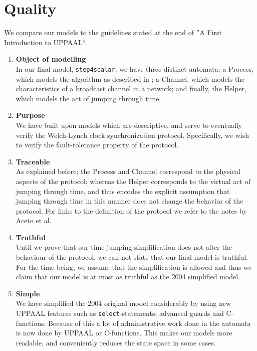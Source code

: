 \documentclass[a4paper,10pt]{article}
\newcommand{\UPPAAL}{UPPAAL\xspace}
\newcommand{\oldorig}{2004 original model\xspace}
\newcommand{\oldsimple}{2004 simplified model\xspace}
\newcommand{\newfinal}{our final model\xspace}
\begin{document}
\section{Quality\label{sec:quality}}


We compare our models to the guidelines stated at the end of ''A First Introduction to UPPAAL``. \cite{Vaandrager2011First}

\begin{enumerate}
\item \textbf{Object of modelling} \\
	In \newfinal, \texttt{step4scalar}, we have three distinct automata: a Process, which models the algorithm as described in \cite{Welch1984Anew}; a Channel, which models the characteristics of a broadcast channel in a network; and finally, the Helper, which models the act of jumping through time.
\item \textbf{Purpose} \\
	We have built upon models which are descriptive, and serve to eventually verify the Welch-Lynch clock synchronization protocol. Specifically, we wish to verify the fault-tolerance property of the protocol.
\item \textbf{Traceable} \\
	As explained before; the Process and Channel correspond to the physical aspects of the protocol; whereas the Helper corresponds to the virtual act of jumping through time, and thus encodes the explicit assumption that jumping through time in this manner does not change the behavior of the protocol. For links to the definition of the protocol we refer to the notes by Aceto et al. \cite{Aceto2004Notes}
\item \textbf{Truthful} \\
	Until we prove that our time jumping simplification does not alter the behaviour of the protocol, we can not state that \newfinal is truthful. For the time being, we assume that the simplification is allowed and thus we claim that our model is at most as truthful as the \oldsimple.
\item \textbf{Simple} \\
	We have simplified the \oldorig considerably by using new \UPPAAL features such as \texttt{select}-statements, advanced guards and C-functions. Because of this a lot of administrative work done in the automata is now done by \UPPAAL or C-functions. This makes our models more readable, and conveniently reduces the state space in some cases.

\end{enumerate}
\end{document}
